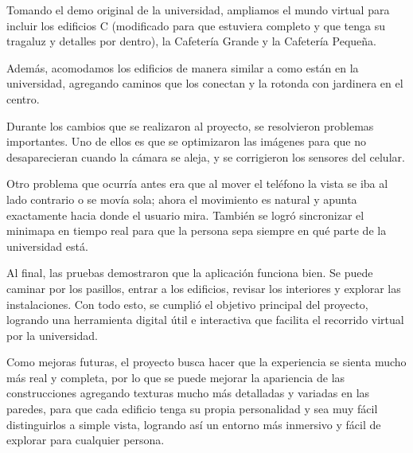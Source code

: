 \documentclass[conference]{IEEEtran}
\begin{document}
Tomando el demo original de la universidad, ampliamos el mundo virtual para incluir los edificios C (modificado para que estuviera completo y que tenga su tragaluz y detalles por dentro), la Cafetería Grande y la Cafetería Pequeña. 

Además, acomodamos los edificios de manera similar a como están en la universidad, agregando caminos que los conectan y la rotonda con jardinera en el centro.

\vspace{0.2cm}

Durante los cambios que se realizaron al proyecto, se resolvieron problemas importantes. Uno de ellos es que se optimizaron las imágenes para que no desaparecieran cuando la cámara se aleja, y se corrigieron los sensores del celular. 

Otro problema que ocurría antes era que al mover el teléfono la vista se iba al lado contrario o se movía sola; ahora el movimiento es natural y apunta exactamente hacia donde el usuario mira. También se logró sincronizar el minimapa en tiempo real para que la persona sepa siempre en qué parte de la universidad está.

\vspace{0.2cm}

Al final, las pruebas demostraron que la aplicación funciona bien. Se puede caminar por los pasillos, entrar a los edificios, revisar los interiores y explorar las instalaciones. Con todo esto, se cumplió el objetivo principal del proyecto, logrando una herramienta digital útil e interactiva que facilita el recorrido virtual por la universidad.

\vspace{0.2cm}

Como mejoras futuras, el proyecto busca hacer que la experiencia se sienta mucho más real y completa, por lo que se puede mejorar la apariencia de las construcciones agregando texturas mucho más detalladas y variadas en las paredes, para que cada edificio tenga su propia personalidad y sea muy fácil distinguirlos a simple vista, logrando así un entorno más inmersivo y fácil de explorar para cualquier persona.

\newpage

\printbibliography
\end{document}
